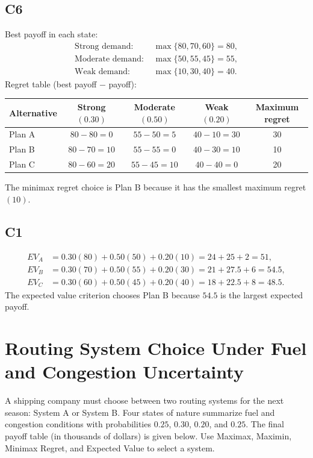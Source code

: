 \begin{ExamProblems}
		\subsection*{C6}
		Best payoff in each state:
		\[
		\begin{aligned}
			\text{Strong demand: } &\max\{80, 70, 60\} = 80, \\
			\text{Moderate demand: } &\max\{50, 55, 45\} = 55, \\
			\text{Weak demand: } &\max\{10, 30, 40\} = 40.
		\end{aligned}
		\]
		Regret table (best payoff $-$ payoff):
		\begin{center}
			\begin{tabular}{l c c c c}
				\toprule
				Alternative & Strong $(0.30)$ & Moderate $(0.50)$ & Weak $(0.20)$ & Maximum regret \\
				\midrule
				Plan A & $80-80=0$ & $55-50=5$ & $40-10=30$ & 30 \\
				Plan B & $80-70=10$ & $55-55=0$ & $40-30=10$ & 10 \\
				Plan C & $80-60=20$ & $55-45=10$ & $40-40=0$ & 20 \\
				\bottomrule
			\end{tabular}
		\end{center}
		The minimax regret choice is Plan B because it has the smallest maximum regret $(10)$.
		
		\subsection*{C1}
		\[
		\begin{aligned}
		EV_A &= 0.30(80)+0.50(50)+0.20(10)=24+25+2=51,\\
		EV_B &= 0.30(70)+0.50(55)+0.20(30)=21+27.5+6=54.5,\\
		EV_C &= 0.30(60)+0.50(45)+0.20(40)=18+22.5+8=48.5.
		\end{aligned}
		\]
		The expected value criterion chooses Plan B because $54.5$ is the largest expected payoff.
		
		\item
		\section{Routing System Choice Under Fuel and Congestion Uncertainty}
		A shipping company must choose between two routing systems for the next season: System A or System B.
		Four states of nature summarize fuel and congestion conditions with probabilities $0.25$, $0.30$, $0.20$, and $0.25$.
		The final payoff table (in thousands of dollars) is given below. Use Maximax, Maximin, Minimax Regret, and Expected Value to select a system.
		

\end{ExamProblems}

